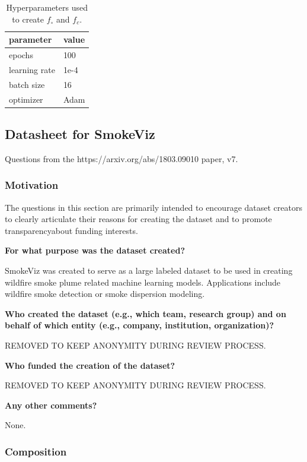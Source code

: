 \documentclass{article}
\begin{document}
\begin{table}
    \caption{Hyperparameters used to create \(f_{\circ}\) and \(f_{c}\).}
  \label{hyper}
  \centering
  \begin{tabular}{ll}
    \toprule
    parameter & value \\ 
    \midrule
    epochs & 100 \\
    learning rate & 1e-4 \\
    batch size & 16 \\
    optimizer & Adam \\
    \bottomrule
  \end{tabular}
\end{table}


\pagebreak

\subsection{Datasheet for SmokeViz}

Questions from the https://arxiv.org/abs/1803.09010 paper, v7.

\subsubsection{Motivation}

The questions in this section are primarily intended to encourage dataset creators to clearly articulate their reasons for creating the dataset and to promote transparencyabout funding interests.

\textbf{For what purpose was the dataset created? }

SmokeViz was created to serve as a large labeled dataset to be used in creating wildfire smoke plume related machine learning models. Applications include wildfire smoke detection or smoke dispersion modeling.

\textbf{Who created the dataset (e.g., which team, research group) and on behalf of which entity (e.g., company, institution, organization)?}

REMOVED TO KEEP ANONYMITY DURING REVIEW PROCESS.

\textbf{Who funded the creation of the dataset?} 

REMOVED TO KEEP ANONYMITY DURING REVIEW PROCESS.

\textbf{Any other comments?}

None.

\subsubsection{Composition}
\end{document}

